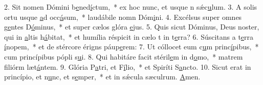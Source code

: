 2. Sit nomen Dómini b\uline{e}ned\uline{í}ctum,~* ex hoc nunc, et usque n sǽc\uline{u}lum.
3. A solis ortu usque \uline{a}d occ\uline{á}sum,~* laudábile nomn Dóm\uline{i}ni.
4. Excélsus super omnes g\uline{e}ntes D\uline{ó}minus,~* et super cælos glóra \uline{e}jus.
5. Quis sicut Dóminus, Deus noster, qui in \uline{a}ltis h\uline{á}bitat,~* et humília réspicit in cælo t in t\uline{e}rra?
6. Súscitans a t\uline{e}rra \uline{í}nopem,~* et de stércore érigns páup\uline{e}rem:
7. Ut cóllocet eum c\uline{u}m princ\uline{í}pibus,~* cum princípibus pópli s\uline{u}i.
8. Qui habitáre facit stéril\uline{e}m in d\uline{o}mo,~* matrem filiórm læt\uline{á}ntem.
9. Glória P\uline{a}tri, et F\uline{í}lio,~* et Spiríti S\uline{a}ncto.
10. Sicut erat in princípio, et n\uline{u}nc, et s\uline{e}mper,~* et in sǽcula sæculrum. \uline{A}men.
